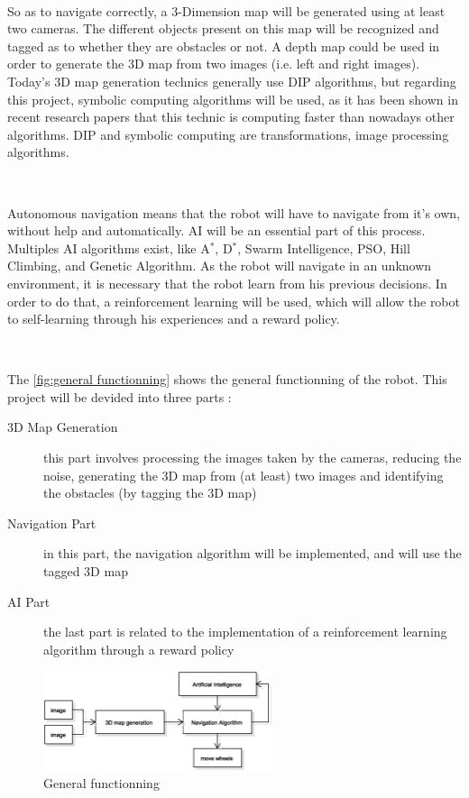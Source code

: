 ~~

So as to navigate correctly, a 3-Dimension map will be generated using at least two cameras. The different objects present on this map will be recognized and tagged as to whether they are obstacles or not. A depth map could be used in order to generate the 3D map from two images (i.e. left and right images). Today's 3D map generation technics generally use \gls{DIP} algorithms, but regarding this project, symbolic computing algorithms will be used, as it has been shown in recent research papers that this technic is computing faster than nowadays other algorithms. \Gls{DIP} and symbolic computing are transformations, \gls{image processing} algorithms. %

~~ 

Autonomous navigation means that the robot will have to navigate from it's own, without help and automatically. \gls{AI} will be an essential part of this process. Multiples \gls{AI} algorithms exist, like A$^*$, D$^*$, Swarm Intelligence, \gls{PSO}, Hill Climbing, and Genetic Algorithm. As the robot will navigate in an unknown environment, it is necessary that the robot learn from his previous decisions. In order to do that, a reinforcement learning will be used, which will allow the robot to self-learning through his experiences and a reward policy.  


~~

The \vref{fig:general functionning} shows the general functionning of the robot. This project will be devided into three parts : 
\begin{description}
	\item[3D Map Generation] this part involves processing the images taken by the cameras, reducing the noise, generating the 3D map from (at least) two images and identifying the obstacles (by tagging the 3D map)
	\item[Navigation Part] in this part, the navigation algorithm will be implemented, and will use the tagged 3D map
	\item[\gls{AI} Part] the last part is related to the implementation of a reinforcement learning algorithm through a reward policy
\end{description}


\begin{figure}[H]
	\centering
	\includegraphics[width=0.6\textwidth]{images/diagrams/flowchart_general}	
    \caption{General functionning}
    \label{fig:general functionning}
\end{figure}



